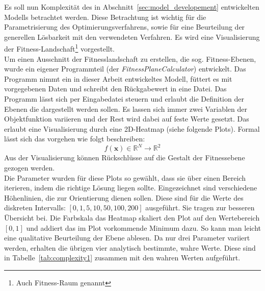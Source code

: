 %
Es soll nun Komplexität des in Abschnitt~\ref{sec:model_developement} entwickelten Modells betrachtet werden. Diese Betrachtung ist wichtig für die Parametrisierung des Optimierungsverfahrens, sowie für eine Beurteilung der generellen Lösbarkeit mit den verwendeten Verfahren. Es wird eine Visualisierung der Fitness-Landschaft\footnote{Auch Fitness-Raum genannt} vorgestellt.\\
%

Um einen Ausschnitt der Fitnesslandschaft zu erstellen, die sog. Fitness-Ebenen, wurde ein eigener Programmteil (der \textit{FitnessPlaneCalculator}) entwickelt. Das Programm nimmt ein in dieser Arbeit entwickeltes Modell, füttert es mit vorgegebenen Daten und schreibt den Rückgabewert in eine Datei. Das Programm lässt sich per Eingabedatei steuern und erlaubt die Definition der Ebenen die dargestellt werden sollen. Es lassen sich immer zwei Variablen der Objektfunktion variieren und der Rest wird dabei auf feste Werte gesetzt. Das erlaubt eine Visualisierung durch eine 2D-Heatmap (siehe folgende Plots). Formal lässt sich das vorgehen wie folgt beschreiben:
%
\begin{equation}
f(\mathbf{x}) \in \mathbb{R}^{N} \rightarrow \mathbb{R}^{2}\nonumber
\end{equation}
%
Aus der Visualisierung können Rückschlüsse auf die Gestalt der Fitnessebene gezogen werden.\\
%

Die Parameter wurden für diese Plots so gewählt, dass sie über einen Bereich iterieren, indem die richtige Lösung liegen sollte. Eingezeichnet sind verschiedene Höhenlinien, die zur Orientierung dienen sollen. Diese sind für die Werte des diskreten Intervalls: $[0,1,5,10,50,100,200]$ ausgeführt. Sie tragen zur besseren Übersicht bei. Die Farbskala das Heatmap skaliert den Plot auf den Wertebereich $[0,1]$ und addiert das im Plot vorkommende Minimum dazu. So kann man leicht eine qualitative Beurteilung der Ebene ablesen. Da nur drei Parameter variiert werden, erhalten die übrigen vier analytisch bestimmte, wahre Werte. Diese sind in Tabelle~\ref{tab:complexity1} zusammen mit den wahren Werten aufgeführt.\\

